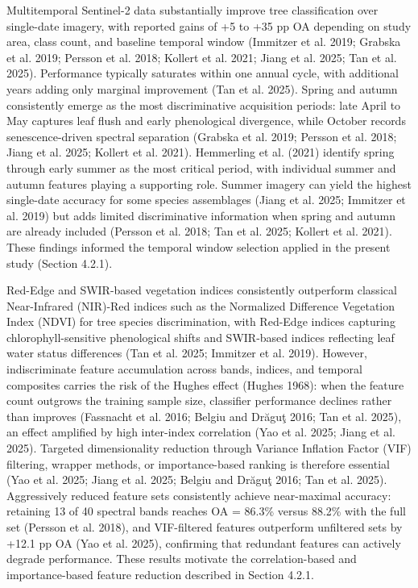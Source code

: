 \documentclass[11pt,a4paper]{scrartcl}
\begin{document}
Multitemporal Sentinel-2 data substantially improve tree classification
over single-date imagery, with reported gains of +5 to +35 pp OA
depending on study area, class count, and baseline temporal window
(Immitzer et al. 2019; Grabska et al. 2019; Persson et al. 2018; Kollert
et al. 2021; Jiang et al. 2025; Tan et al. 2025). Performance typically
saturates within one annual cycle, with additional years adding only
marginal improvement (Tan et al. 2025). Spring and autumn consistently
emerge as the most discriminative acquisition periods: late April to May
captures leaf flush and early phenological divergence, while October
records senescence-driven spectral separation (Grabska et al. 2019;
Persson et al. 2018; Jiang et al. 2025; Kollert et al. 2021). Hemmerling
et al. (2021) identify spring through early summer as the most critical
period, with individual summer and autumn features playing a supporting
role. Summer imagery can yield the highest single-date accuracy for some
species assemblages (Jiang et al. 2025; Immitzer et al. 2019) but adds
limited discriminative information when spring and autumn are already
included (Persson et al. 2018; Tan et al. 2025; Kollert et al. 2021).
These findings informed the temporal window selection applied in the
present study (Section 4.2.1).

Red-Edge and SWIR-based vegetation indices consistently outperform
classical Near-Infrared (NIR)-Red indices such as the Normalized
Difference Vegetation Index (NDVI) for tree species discrimination, with
Red-Edge indices capturing chlorophyll-sensitive phenological shifts and
SWIR-based indices reflecting leaf water status differences (Tan et al.
2025; Immitzer et al. 2019). However, indiscriminate feature
accumulation across bands, indices, and temporal composites carries the
risk of the Hughes effect (Hughes 1968): when the feature count outgrows
the training sample size, classifier performance declines rather than
improves (Fassnacht et al. 2016; Belgiu and Drăguţ 2016; Tan et al.
2025), an effect amplified by high inter-index correlation (Yao et al.
2025; Jiang et al. 2025). Targeted dimensionality reduction through
Variance Inflation Factor (VIF) filtering, wrapper methods, or
importance-based ranking is therefore essential (Yao et al. 2025; Jiang
et al. 2025; Belgiu and Drăguţ 2016; Tan et al. 2025). Aggressively
reduced feature sets consistently achieve near-maximal accuracy:
retaining 13 of 40 spectral bands reaches OA = 86.3\% versus 88.2\% with
the full set (Persson et al. 2018), and VIF-filtered features outperform
unfiltered sets by +12.1 pp OA (Yao et al. 2025), confirming that
redundant features can actively degrade performance. These results
motivate the correlation-based and importance-based feature reduction
described in Section 4.2.1.
\end{document}
